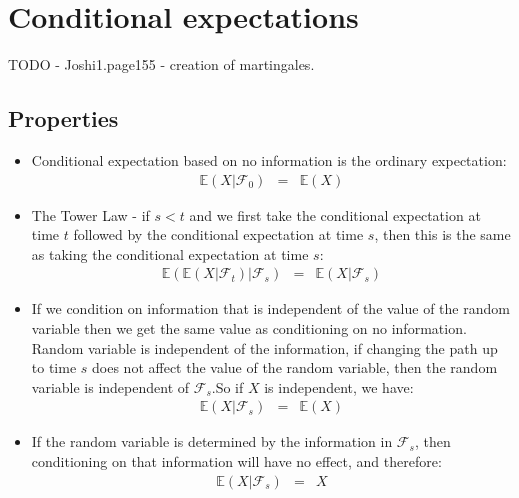 \chapter{Conditional expectations}

TODO - Joshi1.page155 - creation of martingales.

\section{Properties}
\begin{itemize}
	\item Conditional expectation based on no information is the ordinary expectation:
	\begin{eqnarray}
	\mathbb{E}(X\vert \mathscr{F}_{0}) &=& \mathbb{E}(X)
	\end{eqnarray}
	\item The Tower Law - if $s < t$ and we first take the conditional expectation at time $t$ followed by the conditional expectation at time $s$, then this is the same as taking the conditional expectation at time $s$:
	\begin{eqnarray}
		\mathbb{E}(\mathbb{E}(X\vert \mathscr{F}_{t})\vert \mathscr{F}_{s}) &=& \mathbb{E}(X \vert \mathscr{F}_{s})
	\end{eqnarray}
	\item If we condition on information that is independent of the value of the random variable then we get the same value as conditioning on no information. Random variable is independent of the information, if changing the path up to time $s$ does not affect the value of the random variable, then the random variable is independent of $\mathscr{F}_{s}$.So if $X$ is independent, we have:
	\begin{eqnarray}
		\mathbb{E}(X\vert \mathscr{F}_{s}) &=& \mathbb{E}(X)
	\end{eqnarray}
	\item If the random variable is determined by the information in $\mathscr{F}_{s}$, then conditioning on that information will have no effect, and therefore:
	\begin{eqnarray}
	\mathbb{E}(X\vert\mathscr{F}_{s}) &=& X
	\end{eqnarray}
\end{itemize}

